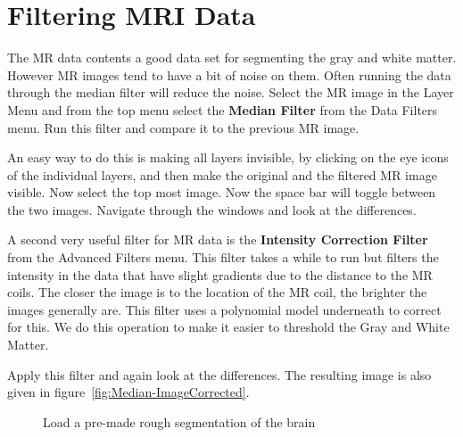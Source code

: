 \documentclass[fleqn,11pt,openany]{book}
\begin{document}
\section{Filtering MRI Data}

The MR data contents a good data set for segmenting the gray and white matter. However MR images  tend to have a bit of noise on them. Often running the data through the median filter will reduce the noise. Select the MR image in the Layer Menu and  from the top menu select the {\bf Median Filter} from the Data Filters menu. Run this filter and compare it to the previous MR image.

An easy way to do this is making all layers invisible, by clicking on the eye icons of the individual layers, and then make the original and the filtered MR image visible. Now select the top most image. Now the space bar will toggle between the two images. Navigate through the windows and look at the differences.

A second very useful filter for MR data is the {\bf Intensity Correction Filter} from the Advanced Filters menu. This filter takes a while to run  but filters the intensity in the data that have slight gradients due to the distance to the MR coils. The closer the image is to the location of the MR coil, the brighter the images generally are. This filter uses a polynomial model underneath to correct for this. We do this operation to make it easier to threshold the Gray and White Matter.

Apply this filter and again look at the differences. The resulting image is also given in figure~\ref{fig:Median-ImageCorrected}. 

\begin{figure}
\caption{Load a pre-made rough segmentation of the brain}\label{fig:LoadingSegmentation}
\end{figure}
\end{document}
